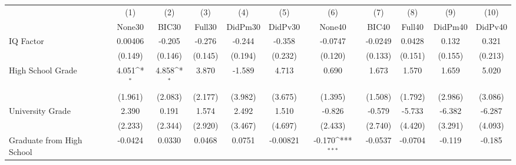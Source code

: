 {
\def\sym#1{\ifmmode^{#1}\else\(^{#1}\)\fi}
\begin{tabular}{l*{10}{c}}
\toprule
            &\multicolumn{1}{c}{(1)}&\multicolumn{1}{c}{(2)}&\multicolumn{1}{c}{(3)}&\multicolumn{1}{c}{(4)}&\multicolumn{1}{c}{(5)}&\multicolumn{1}{c}{(6)}&\multicolumn{1}{c}{(7)}&\multicolumn{1}{c}{(8)}&\multicolumn{1}{c}{(9)}&\multicolumn{1}{c}{(10)}\\
            &\multicolumn{1}{c}{None30}&\multicolumn{1}{c}{BIC30}&\multicolumn{1}{c}{Full30}&\multicolumn{1}{c}{DidPm30}&\multicolumn{1}{c}{DidPv30}&\multicolumn{1}{c}{None40}&\multicolumn{1}{c}{BIC40}&\multicolumn{1}{c}{Full40}&\multicolumn{1}{c}{DidPm40}&\multicolumn{1}{c}{DidPv40}\\
\midrule
IQ Factor   &     0.00406         &      -0.205         &      -0.276         &      -0.244         &      -0.358         &     -0.0747         &     -0.0249         &      0.0428         &       0.132         &       0.321         \\
            &     (0.149)         &     (0.146)         &     (0.145)         &     (0.194)         &     (0.232)         &     (0.120)         &     (0.133)         &     (0.151)         &     (0.155)         &     (0.213)         \\
\addlinespace
High School Grade&       4.051\sym{*}  &       4.858\sym{*}  &       3.870         &      -1.589         &       4.713         &       0.690         &       1.673         &       1.570         &       1.659         &       5.020         \\
            &     (1.961)         &     (2.083)         &     (2.177)         &     (3.982)         &     (3.675)         &     (1.395)         &     (1.508)         &     (1.792)         &     (2.986)         &     (3.086)         \\
\addlinespace
University Grade&       2.390         &       0.191         &       1.574         &       2.492         &       1.510         &      -0.826         &      -0.579         &      -5.733         &      -6.382         &      -6.287         \\
            &     (2.233)         &     (2.344)         &     (2.920)         &     (3.467)         &     (4.697)         &     (2.433)         &     (2.740)         &     (4.420)         &     (3.291)         &     (4.093)         \\
\addlinespace
Graduate from High School&     -0.0424         &      0.0330         &      0.0468         &      0.0751         &    -0.00821         &      -0.170\sym{***}&     -0.0537         &     -0.0704         &      -0.119         &      -0.185         \\

\end{tabular}}
